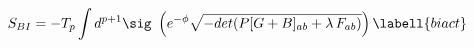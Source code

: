 \begin{equation}
S_{BI}=-T_p \int d^{p+1}\sig\
\left(e^{-\phi}\sqrt{-det(P[G+B]_{ab}+ \lambda\,F_{ab})}\right)
\labell{biact}
\end{equation}

